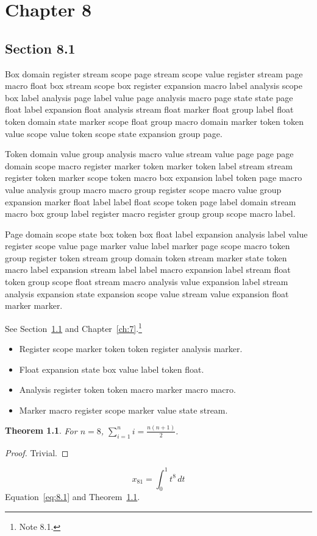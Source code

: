 \documentclass[11pt,twoside]{book}
\newtheorem{theorem}{Theorem}[chapter]
\begin{document}
\chapter{Chapter 8}\label{ch:8}
\section{Section 8.1}\label{sec:8.1}
Box domain register stream scope page stream scope value register stream page macro float box stream scope box register expansion macro label analysis scope box label analysis page label value page analysis macro page state state page float label expansion float analysis stream float marker float group label float token domain state marker scope float group macro domain marker token token value scope value token scope state expansion group page.

Token domain value group analysis macro value stream value page page page domain scope macro register marker token marker token label stream stream register token marker scope token macro box expansion label token page macro value analysis group macro macro group register scope macro value group expansion marker float label label float scope token page label domain stream macro box group label register macro register group group scope macro label.

Page domain scope state box token box float label expansion analysis label value register scope value page marker value label marker page scope macro token group register token stream group domain token stream marker state token macro label expansion stream label label macro expansion label stream float token group scope float stream macro analysis value expansion label stream analysis expansion state expansion scope value stream value expansion float marker marker.

See Section~\ref{sec:8.1} and Chapter~\ref{ch:7}.\footnote{Note 8.1.}
\begin{itemize}\item Register scope marker token token register analysis marker.\item Float expansion state box value label token float.\item Analysis register token token macro marker macro macro.\item Marker macro register scope marker value state stream.\end{itemize}
\begin{theorem}\label{thm:8.1}For $n=8$, $\sum_{i=1}^{n}i=\frac{n(n+1)}{2}$.\end{theorem}\begin{proof}Trivial.\end{proof}
\begin{equation}x_{81}=\int_0^{1}t^{8}\,dt\label{eq:8.1}\end{equation} Equation~\eqref{eq:8.1} and Theorem~\ref{thm:8.1}.
\end{document}
